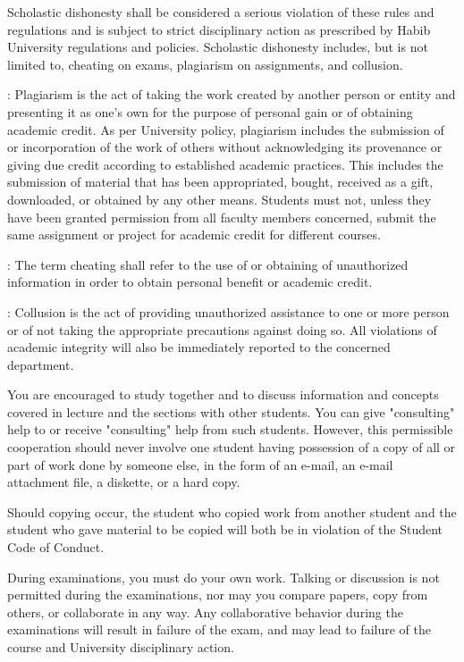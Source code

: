 \documentclass[a4paper,11pt]{article}
\begin{document}
Scholastic dishonesty shall be considered a serious violation of these rules and regulations and is subject to strict disciplinary action as prescribed by Habib University regulations and policies. Scholastic dishonesty includes, but is not limited to, cheating on exams, plagiarism on assignments, and collusion. 

: Plagiarism is the act of taking the work created by another person or entity and presenting it as one's own for the purpose of personal gain or of obtaining academic credit. As per University policy, plagiarism includes the submission of or incorporation of the work of others without acknowledging its provenance or giving due credit according to established academic practices. This includes the submission of material that has been appropriated, bought, received as a gift, downloaded, or obtained by any other means. Students must not, unless they have been granted permission from all faculty members concerned, submit the same assignment or project for academic credit for different courses. 

: The term cheating shall refer to the use of or obtaining of unauthorized information in order to obtain personal benefit or academic credit. 

: Collusion is the act of providing unauthorized assistance to one or more person or of not taking the appropriate precautions against doing so. 
All violations of academic integrity will also be immediately reported to the concerned department.  

You are encouraged to study together and to discuss information and concepts covered in lecture and the sections with other students. You can give "consulting" help to or receive "consulting" help from such students. However, this permissible cooperation should never involve one student having possession of a copy of all or part of work done by someone else, in the form of an e-mail, an e-mail attachment file, a diskette, or a hard copy. 

Should copying occur, the student who copied work from another student and the student who gave material to be copied will both be in violation of the Student Code of Conduct. 

During examinations, you must do your own work. Talking or discussion is not permitted during the examinations, nor may you compare papers, copy from others, or collaborate in any way. Any collaborative behavior during the examinations will result in failure of the exam, and may lead to failure of the course and University disciplinary action.
\end{document}
